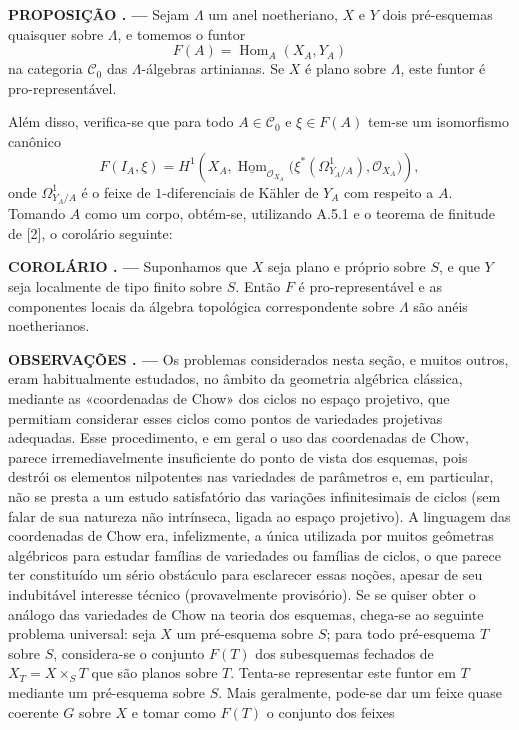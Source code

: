 \documentclass[11pt,twoside,openany]{book}
\numberwithin{equation}{section}
\newcommand{\src}[1]{%
  \phantomsection\hypertarget{src:#1}{}%
  \marginpar{\raggedleft\footnotesize\sffamily #1}%
}
\theoremstyle{plain}
\theoremstyle{definition}
\theoremstyle{remark}
\newcommand{\result}[2]{%
  \par\medskip\noindent\textbf{#1%
  \if\relax\detokenize{#2}\relax\else\space#2\fi. ---}\enspace
}
\newcommand{\FgaUnitKey}{frontmatter}
\renewcommand{\src}[1]{%
  \phantomsection\hypertarget{src:\FgaUnitKey:#1}{}%
  \marginpar{\raggedleft\footnotesize\sffamily #1}%
}
\begin{document}
\src{382}
\result{PROPOSIÇÃO}{2.1} Sejam $\Lambda$ um anel noetheriano, $X$ e $Y$ dois
pré-esquemas quaisquer sobre $\Lambda$, e tomemos o funtor
\[
  F(A)=\operatorname{Hom}_A(X_A,Y_A)
\]
na categoria $\mathcal C_0$ das $\Lambda$-álgebras artinianas. Se $X$ é
plano sobre $\Lambda$, este funtor é pro-representável.

Além disso, verifica-se que para todo $A\in\mathcal C_0$ e $\xi\in F(A)$ tem-se
um isomorfismo canônico
\[
  F(I_A,\xi)=H^1\!\left(
    X_A,
    \underline{\operatorname{Hom}}_{\mathcal O_{X_A}}
    \bigl(\xi^*(\Omega^1_{Y_A/A}),\mathcal O_{X_A}\bigr)
  \right),
\]
onde $\Omega^1_{Y_A/A}$ é o feixe de $1$-diferenciais de Kähler de $Y_A$
com respeito a $A$. Tomando $A$ como um corpo, obtém-se, utilizando A.5.1 e o
teorema de finitude de [2], o corolário seguinte:

\result{COROLÁRIO}{} Suponhamos que $X$ seja plano e próprio sobre $S$, e que $Y$
seja localmente de tipo finito sobre $S$. Então $F$ é pro-representável e as
componentes locais da álgebra topológica correspondente sobre $\Lambda$ são
anéis noetherianos.

\result{OBSERVAÇÕES}{} Os problemas considerados nesta seção, e muitos
outros, eram habitualmente estudados, no âmbito da geometria algébrica
clássica, mediante as «coordenadas de Chow» dos ciclos no espaço
projetivo, que permitiam considerar esses ciclos como pontos de variedades
projetivas adequadas. Esse procedimento, e em geral o uso das
coordenadas de Chow, parece irremediavelmente insuficiente do ponto de
vista dos esquemas, pois destrói os elementos nilpotentes nas
variedades de parâmetros e, em particular, não se presta a um estudo
satisfatório das variações infinitesimais de ciclos (sem falar de sua
natureza não intrínseca, ligada ao espaço projetivo). A linguagem das
coordenadas de Chow era, infelizmente, a única utilizada por muitos
geômetras algébricos para estudar famílias de variedades ou famílias de
ciclos, o que parece ter constituído um sério obstáculo para esclarecer essas
noções, apesar de seu indubitável interesse técnico (provavelmente provisório). Se
se quiser obter o análogo das variedades de Chow na teoria dos
esquemas, chega-se ao seguinte problema universal: seja $X$ um pré-esquema sobre
$S$; para todo pré-esquema $T$ sobre $S$, considera-se o conjunto $F(T)$ dos
subesquemas fechados de $X_T=X\times_ST$ que são planos sobre $T$. Tenta-se
representar este funtor em $T$ mediante um pré-esquema sobre $S$. Mais
geralmente, pode-se dar um feixe quase coerente $G$ sobre $X$ e tomar como
$F(T)$ o conjunto dos feixes
\end{document}
